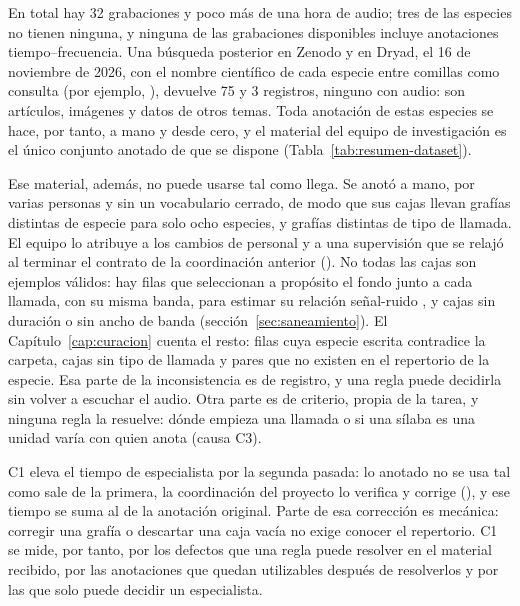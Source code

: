 En total hay 32 grabaciones y poco más de una hora de audio; tres de las especies
no tienen ninguna, y ninguna de las grabaciones disponibles incluye anotaciones
tiempo--frecuencia. Una búsqueda posterior en Zenodo y en Dryad, el 16 de
noviembre de 2026, con el nombre científico de cada especie entre comillas como
consulta (por ejemplo, ), devuelve 75 y 3 registros,
ninguno con audio: son artículos, imágenes y
datos de otros temas. Toda anotación de estas especies se hace, por tanto, a mano y
desde cero, y el material del equipo de investigación es el único conjunto
anotado de que se dispone (Tabla~\ref{tab:resumen-dataset}).

Ese material, además, no puede usarse tal como llega. Se anotó a mano, por varias
personas y sin un vocabulario cerrado, de modo que sus \nRawRows{} cajas llevan
\nRawSpeciesValues{} grafías distintas de especie para solo ocho especies, y
\nRawCallValues{} grafías distintas de tipo de llamada. El equipo lo atribuye a
los cambios de personal y a una supervisión que se relajó al terminar el contrato
de la coordinación anterior (\cpEquipo). No todas las cajas son ejemplos válidos:
hay filas que seleccionan a propósito el fondo junto a cada llamada, con su misma
banda, para estimar su relación señal-ruido \citep{proyecto8_manual_2025}, y cajas sin duración o
sin ancho de banda
(sección~\ref{sec:saneamiento}). El Capítulo~\ref{cap:curacion} cuenta el resto:
\nSpeciesMismatch{} filas cuya especie escrita contradice la carpeta,
\nEmptyCall{} cajas sin tipo de llamada y pares que no existen en el repertorio
de la especie. Esa parte de la inconsistencia es de registro, y una regla puede
decidirla sin volver a escuchar el audio. Otra parte es de criterio, propia de la
tarea, y ninguna regla la resuelve: dónde empieza una llamada o si una sílaba es
una unidad varía con quien anota (causa C3).

C1 eleva el tiempo de especialista por la segunda pasada: lo anotado no se usa tal
como sale de la primera, la coordinación del proyecto lo verifica y corrige
(\cpEquipo), y ese tiempo se suma al de la anotación original. Parte de esa
corrección es mecánica: corregir una grafía o descartar una caja vacía no exige
conocer el repertorio. C1 se mide, por tanto, por los defectos que una regla
puede resolver en el material recibido, por las anotaciones que quedan
utilizables después de resolverlos y por las que solo puede decidir un
especialista.

